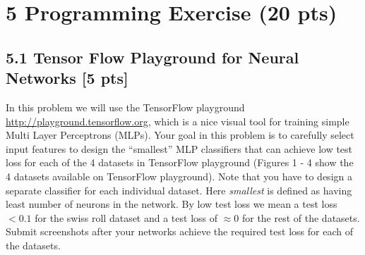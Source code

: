 \section*{5 Programming Exercise (20 pts)}
\subsection*{5.1 Tensor Flow Playground for Neural Networks [5 pts]}
In this problem we will use the TensorFlow playground \href{http://playground.tensorflow.org}{http://playground.tensorflow.org}, which is a nice visual tool for training simple Multi Layer Perceptrons (MLPs).
Your goal in this problem is to carefully select input features to design the ``smallest'' MLP classifiers that can achieve low test loss for each of the 4 datasets in TensorFlow playground (Figures 1 - 4 show the 4 datasets available on TensorFlow playground). Note that you have to design a separate classifier for each individual dataset.  Here \emph{smallest} is defined as having least number of neurons in the network. By low test loss we mean a test loss $< 0.1$ for the swiss roll dataset and a test loss of $\approx 0$ for the rest of the datasets. Submit screenshots after your networks achieve the required test loss for each of the datasets.

